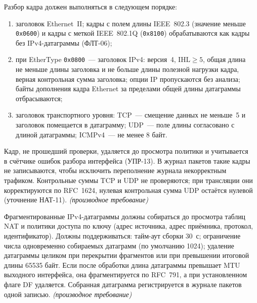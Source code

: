 \documentclass[12pt,a4paper,final]{article}
\newenvironment{reqs}
  {\begin{description}[style=sameline,leftmargin=2.2cm,labelwidth=2.0cm,
     labelsep=0.2cm,font=\normalfont\bfseries,itemsep=3pt]}
  {\end{description}}
\newcommand{\der}{\textit{(производное требование)}}
\begin{document}
\begin{reqs}
\item[ОБР-06] Разбор кадра должен выполняться в следующем порядке:
  \begin{enumerate}
  \item заголовок Ethernet~II; кадры с полем длины IEEE~802.3 (значение меньше
    \texttt{0x0600}) и кадры с меткой IEEE~802.1Q (\texttt{0x8100})
    обрабатываются как кадры без IPv4-датаграммы (ФЛТ-06);
  \item при EtherType \texttt{0x0800}~— заголовок IPv4: версия~4,
    $\mathrm{IHL} \ge 5$, общая длина не меньше длины заголовка и не больше
    длины полезной нагрузки кадра, верная контрольная сумма заголовка;
    опции IP пропускаются без анализа; байты дополнения кадра Ethernet
    за пределами общей длины датаграммы отбрасываются;
  \item заголовок транспортного уровня: TCP~— смещение данных не меньше~5
    и заголовок помещается в датаграмму; UDP~— поле длины согласовано
    с длиной датаграммы; ICMPv4~— не менее 8 байт.
  \end{enumerate}
  Кадр, не прошедший проверки, удаляется до просмотра политики и учитывается
  в счётчике ошибок разбора интерфейса (УПР-13). В журнал пакетов такие кадры
  не записываются, чтобы исключить переполнение журнала некорректным
  трафиком. Контрольные суммы TCP и UDP не проверяются; при трансляции они
  корректируются по RFC~1624, нулевая контрольная сумма UDP остаётся
  нулевой (уточнение НАТ-11). \der

\item[ОБР-07] Фрагментированные IPv4-датаграммы должны собираться до
  просмотра таблиц NAT и политики доступа по ключу (адрес источника, адрес
  приёмника, протокол, идентификатор). Должны поддерживаться: тайм-аут сборки
  30~с; ограничение числа одновременно собираемых датаграмм (по умолчанию
  1024); удаление датаграммы целиком при перекрытии фрагментов или при
  превышении итоговой длины 65535 байт. Если после обработки длина датаграммы
  превышает MTU выходного интерфейса, она фрагментируется по RFC~791, а при
  установленном флаге DF удаляется. Собранная датаграмма регистрируется
  в журнале пакетов одной записью. \der


\end{reqs}
\end{document}
